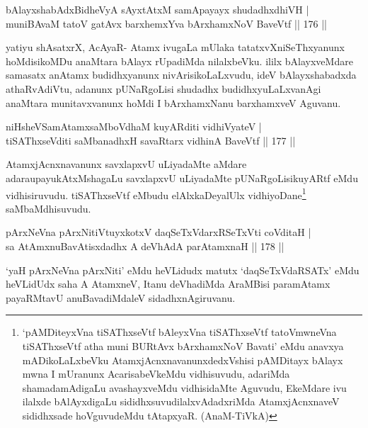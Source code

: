 \begin{shl}
bAlayxshabAdxBidheVyA sAyxtAtxM samApayayx shudadhxdhiVH |\\
muniBAvaM tatoV gatAvx barxhemxYva bArxhamxNoV BaveVtf \hfill || 176 ||
\end{shl}

\begin{artha}
yatiyu shAsatxrX, AcAyaR- Atamx ivugaLa mUlaka tatatxvXniSeThxyanunx hoMdisikoMDu anaMtara bAlayx rUpadiMda nilalxbeVku. ililx bAlayxveMdare samasatx anAtamx budidhxyanunx nivArisikoLaLxvudu, ideV bAlayxshabadxda athaRvAdiVtu, adanunx pUNaRgoLisi shudadhx budidhxyuLaLxvanAgi anaMtara munitavxvanunx hoMdi I bArxhamxNanu barxhamxveV Aguvanu.
\end{artha}

\begin{shl}
niHsheVSamAtamxsaMboVdhaM kuyARditi vidhiVyateV |\\
tiSAThxseVditi saMbanadhxH savaRtarx vidhinA BaveVtf \hfill || 177 ||
\end{shl}

\begin{artha}
AtamxjAcnxnavanunx savxlapxvU uLiyadaMte aMdare adara\break upayukAtxMshagaLu savxlapxvU uLiyadaMte pUNaRgoLisi\break kuyARtf eMdu vidhisiruvudu. tiSAThxseVtf eMbudu elAlxkaDeyalUlx vidhiyoDane\footnote{`pAMDiteyxVna tiSAThxseVtf bAleyxVna tiSAThxseVtf tatoVmwneVna tiSAThxseVtf atha muni BURtAvx bArxhamxNoV Bavati' eMdu anavxya mADikoLaLxbeVku AtamxjAcnxnavanunxdedxVshisi pAMDitayx bAlayx mwna I mUranunx AcarisabeVkeMdu vidhisuvudu, adariMda shamadamAdigaLu avashayxveMdu vidhisidaMte Aguvudu, EkeMdare ivu ilalxde bAlAyxdigaLu sididhxsuvudilalxvAdadxriMda AtamxjAcnxnaveV sididhxsade hoVguvudeMdu tAtapxyaR. (AnaM-TiVkA)} saMbaMdhisuvudu.
\end{artha}


\begin{shl}
pArxNeVna pArxNitiVtuyxkotxV daqSeTxVdarxRSeTxVti coVditaH |\\
sa AtAmx\s nuBavAtisxdadhx A deVhAdA parAtamxnaH \hfill || 178 ||
\end{shl}

\begin{artha}
`yaH pArxNeVna pArxNiti' eMdu heVLidudx matutx `daqSeTxVdaRSATx' eMdu heVLidUdx saha A AtamxneV, Itanu deVhadiMda AraMBisi paramAtamx payaRMtavU anuBavadiMdaleV sidadhxnAgiruvanu.
\end{artha}

